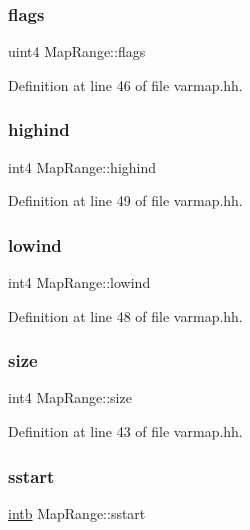 \subsubsection{\texorpdfstring{flags}{flags}}
{\footnotesize\ttfamily uint4 Map\+Range\+::flags}



Definition at line 46 of file varmap.\+hh.

\mbox{\label{struct_map_range_a07afd2566a9e2f5c89c630d668aabe6e}} 
\subsubsection{\texorpdfstring{highind}{highind}}
{\footnotesize\ttfamily int4 Map\+Range\+::highind}



Definition at line 49 of file varmap.\+hh.

\mbox{\label{struct_map_range_a9fe9bca51c84c321bb5e8293b9f5a09a}} 
\subsubsection{\texorpdfstring{lowind}{lowind}}
{\footnotesize\ttfamily int4 Map\+Range\+::lowind}



Definition at line 48 of file varmap.\+hh.

\mbox{\label{struct_map_range_ae1f42ce044f606f67a880ca2fe8e90b7}} 
\subsubsection{\texorpdfstring{size}{size}}
{\footnotesize\ttfamily int4 Map\+Range\+::size}



Definition at line 43 of file varmap.\+hh.

\mbox{\label{struct_map_range_a1bdc3b362845acf405fc8b3cde537e8a}} 
\subsubsection{\texorpdfstring{sstart}{sstart}}
{\footnotesize\ttfamily \mbox{\hyperlink{types_8h_aa925ba3e627c2df89d5b1cfe84fb8572}{intb}} Map\+Range\+::sstart}



